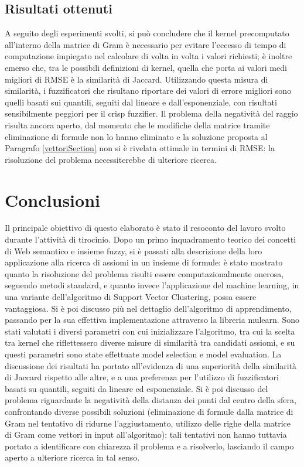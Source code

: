 \documentclass[12pt,a4paper]{report}
\begin{document}
\section{Risultati ottenuti}
A seguito degli esperimenti svolti, si può concludere che il kernel precomputato all'interno della matrice di Gram è necessario per evitare l'eccesso di tempo di computazione impiegato nel calcolare di volta in volta i valori richiesti; è inoltre emerso che, tra le possibili definizioni di kernel, quella che porta ai valori medi migliori di RMSE è la similarità di Jaccard. Utilizzando questa misura di similarità, i fuzzificatori che risultano riportare dei valori di errore migliori sono quelli basati sui quantili, seguiti dal lineare e dall'esponenziale, con risultati sensibilmente peggiori per il crisp fuzzifier.
Il problema della negatività del raggio risulta ancora aperto, dal momento che le modifiche della matrice tramite eliminazione di formule non lo hanno eliminato e la soluzione proposta al Paragrafo \ref{vettoriSection} non si è rivelata ottimale in termini di RMSE: la risoluzione del problema necessiterebbe di ulteriore ricerca.

\chapter*{Conclusioni}

Il principale obiettivo di questo elaborato è stato il resoconto del lavoro svolto durante l'attività di tirocinio. Dopo un primo inquadramento teorico dei concetti di Web semantico e insieme fuzzy, si è passati alla descrizione della loro applicazione alla ricerca di assiomi in un insieme di formule: è stato mostrato quanto la risoluzione del problema risulti essere computazionalmente onerosa, seguendo metodi standard, e quanto invece l'applicazione del machine learning, in una variante dell'algoritmo di Support Vector Clustering, possa essere vantaggiosa.
Si è poi discusso più nel dettaglio dell'algoritmo di apprendimento, passando per la sua effettiva implementazione attraverso la libreria mulearn.
Sono stati valutati i diversi parametri con cui inizializzare l'algoritmo, tra cui la scelta tra kernel che riflettessero diverse misure di similarità tra candidati assiomi, e su questi parametri sono state effettuate model selection e model evaluation. La discussione dei risultati ha portato all'evidenza di una superiorità della similarità di Jaccard rispetto alle altre, e a una preferenza per l'utilizzo di fuzzificatori basati su quantili, seguiti da lineare ed esponenziale.
Si è poi discusso del problema riguardante la negatività della distanza dei punti dal centro della sfera, confrontando diverse possibili soluzioni (eliminazione di formule dalla matrice di Gram nel tentativo di ridurne l'aggiustamento, utilizzo delle righe della matrice di Gram come vettori in input all'algoritmo): tali tentativi non hanno tuttavia portato a identificare con chiarezza il problema e a risolverlo, lasciando il campo aperto a ulteriore ricerca in tal senso.



\end{document}
